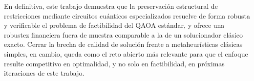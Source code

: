 En definitiva, este trabajo demuestra que la preservación estructural de restricciones mediante circuitos
cuánticos especializados resuelve de forma robusta y verificable el problema de factibilidad del QAOA estándar,
y ofrece una robustez financiera fuera de muestra comparable a la de un solucionador clásico exacto. Cerrar la
brecha de calidad de solución frente a metaheurísticas clásicas simples, en cambio, queda como el reto abierto
más relevante para que el enfoque resulte competitivo en optimalidad, y no solo en factibilidad, en próximas
iteraciones de este trabajo.